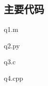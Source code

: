 \documentclass[withoutpreface,bwprint]{cumcmthesis}
\begin{document}
\newpage
\begin{appendices}

\section{主要代码}
\noindent q1.m

q2.py

q3.c

q4.cpp

\end{appendices}
\end{document}

